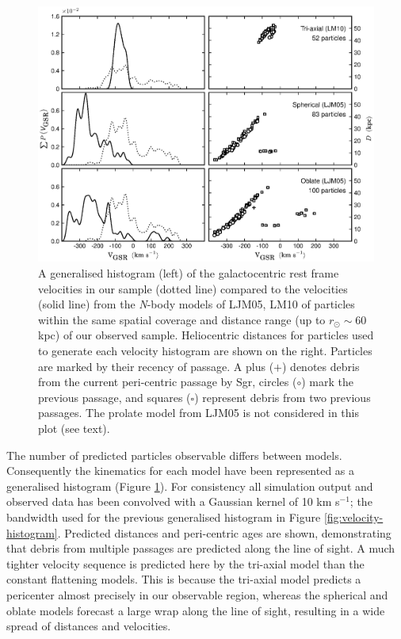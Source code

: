 \documentclass[preprint2]{aastex}
\begin{document}
	\begin{figure}[t!]
		\includegraphics[width=\textwidth]{./figures/lawvelcompare-bw.eps}
		\caption{A generalised histogram (left) of the galactocentric rest frame velocities in our sample (dotted line) compared to the velocities (solid line) from the \textit{N}-body models of LJM05, LM10 of particles within the same spatial coverage and distance range (up to $r_\odot \sim 60$ kpc) of our observed sample. Heliocentric distances for particles used to generate each velocity histogram are shown on the right. Particles are marked by their recency of passage. A plus ($+$) denotes debris from the current peri-centric passage by Sgr, circles ($\circ$) mark the previous passage, and squares ($\square$) represent debris from two previous passages. The prolate model from LJM05 is not considered in this plot (see text).}
		\label{fig:law-vel-compare}
	\end{figure}
	
	The number of predicted particles observable differs between models. Consequently the kinematics for each model have been represented as a generalised histogram (Figure \ref{fig:law-vel-compare}). For consistency all simulation output and observed data has been convolved with a Gaussian kernel of 10 km s$^{-1}$; the bandwidth used for the previous generalised histogram in Figure \ref{fig:velocity-histogram}. Predicted distances and peri-centric ages are shown, demonstrating that debris from multiple passages are predicted along the line of sight. A much tighter velocity sequence is predicted here by the tri-axial model than the constant flattening models. This is because the tri-axial model predicts a pericenter almost precisely in our observable region, whereas the spherical and oblate models forecast a large wrap along the line of sight, resulting in a wide spread of distances and velocities.
	
\end{document}
